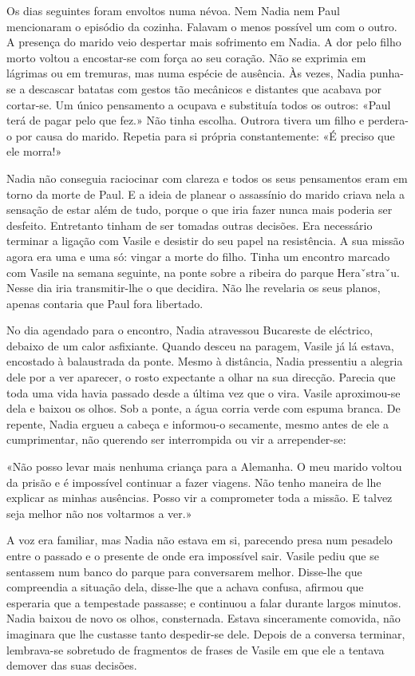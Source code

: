 Os dias seguintes foram envoltos numa névoa. Nem Nadia nem Paul
mencionaram o episódio da cozinha. Falavam o menos possível um com o
outro. A presença do marido veio despertar mais sofrimento em Nadia. A
dor pelo filho morto voltou a encostar-se com força ao seu coração. Não
se exprimia em lágrimas ou em tremuras, mas numa espécie de ausência. Às
vezes, Nadia punha-se a descascar batatas com gestos tão mecânicos e
distantes que acabava por cortar-se. Um único pensamento a ocupava e
substituía todos os outros: «Paul terá de pagar pelo que fez.» Não tinha
escolha. Outrora tivera um filho e perdera-o por causa do marido.
Repetia para si própria constantemente: «É preciso que ele morra!»

Nadia não conseguia raciocinar com clareza e todos os seus pensamentos
eram em torno da morte de Paul. E a ideia de planear o assassínio do
marido criava nela a sensação de estar além de tudo, porque o que iria
fazer nunca mais poderia ser desfeito. Entretanto tinham de ser tomadas outras decisões. Era necessário terminar a ligação com Vasile e
desistir do seu papel na resistência. A sua missão agora era uma e uma
só: vingar a morte do filho. Tinha um encontro marcado com Vasile na
semana seguinte, na ponte sobre a ribeira do parque Heraˇstraˇu. Nesse
dia iria transmitir-lhe o que decidira. Não lhe revelaria os seus
planos, apenas contaria que Paul fora libertado.

No dia agendado para o encontro, Nadia atravessou Bucareste de
eléctrico, debaixo de um calor asfixiante. Quando desceu na paragem,
Vasile já lá estava, encostado à balaustrada da ponte. Mesmo à
distância, Nadia pressentiu a alegria dele por a ver aparecer, o rosto expectante a olhar na
sua direcção. Parecia que toda uma vida havia passado desde a última vez
que o vira. Vasile aproximou-se dela e baixou os olhos. Sob a ponte, a
água corria verde com espuma branca. De repente, Nadia ergueu a cabeça e
informou-o secamente, mesmo antes de ele a cumprimentar, não querendo
ser interrompida ou vir a arrepender-se:

«Não posso levar mais nenhuma criança para a Alemanha. O meu marido
voltou da prisão e é impossível continuar a fazer viagens. Não tenho
maneira de lhe explicar as minhas ausências. Posso vir a comprometer
toda a missão. E talvez seja melhor não nos voltarmos a ver.»

A voz era familiar, mas Nadia não estava em si, parecendo presa num
pesadelo entre o passado e o presente de onde era impossível sair.
Vasile pediu que se sentassem num banco do parque para conversarem
melhor. Disse-lhe que compreendia a situação dela, disse-lhe que a
achava confusa, afirmou que esperaria que a tempestade passasse; e
continuou a falar durante largos minutos. Nadia baixou de novo os olhos,
consternada. Estava sinceramente comovida, não imaginara que lhe
custasse tanto despedir-se dele. Depois de a conversa terminar,
lembrava-se sobretudo de fragmentos de frases de Vasile em que ele a
tentava demover das suas decisões.

